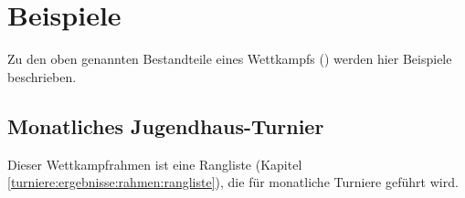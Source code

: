 \section{Beispiele}
\label{turniere:beispiele}

Zu den oben genannten Bestandteile eines Wettkampfs () werden hier Beispiele beschrieben.

\subsection{Monatliches Jugendhaus-Turnier}
\label{turniere:beispiele:jugend}

Dieser Wettkampfrahmen ist eine Rangliste (Kapitel \ref{turniere:ergebnisse:rahmen:rangliste}), die für monatliche Turniere geführt wird.

